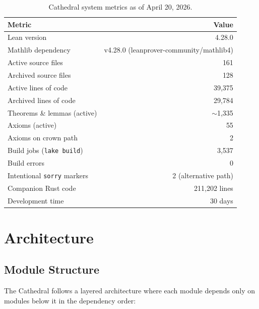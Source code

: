 \documentclass[11pt,a4paper]{article}
\begin{document}
\begin{table}[h]
\centering
\begin{tabular}{@{}lr@{}}
\toprule
\textbf{Metric} & \textbf{Value} \\
\midrule
Lean version & 4.28.0 \\
Mathlib dependency & v4.28.0 (leanprover-community/mathlib4) \\
Active source files & 161 \\
Archived source files & 128 \\
Active lines of code & 39,375 \\
Archived lines of code & 29,784 \\
Theorems \& lemmas (active) & $\sim$1,335 \\
Axioms (active) & 55 \\
Axioms on crown path & 2 \\
Build jobs (\texttt{lake build}) & 3,537 \\
Build errors & 0 \\
Intentional \texttt{sorry} markers & 2 (alternative path) \\
Companion Rust code & 211,202 lines \\
Development time & 30 days \\
\bottomrule
\end{tabular}
\caption{Cathedral system metrics as of April 20, 2026.}
\label{tab:metrics}
\end{table}

\section{Architecture}
\label{sec:architecture}

\subsection{Module Structure}

The Cathedral follows a layered architecture where each module depends
only on modules below it in the dependency order:
\end{document}
